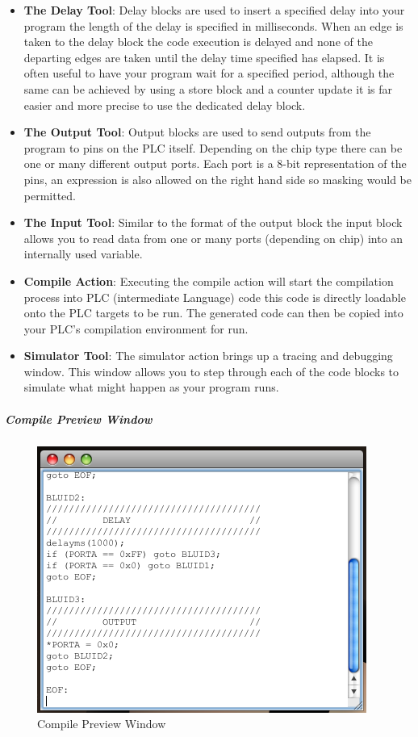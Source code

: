 \begin{itemize}
\item \textbf{The Delay Tool}: Delay blocks are used to insert a specified delay into your program the length of the delay is specified in milliseconds. When an edge is taken to the delay block the code execution is delayed and none of the departing edges are taken until the delay time specified has elapsed. It is often useful to have your program wait for a specified period, although the same can be achieved by using a store block and a counter update it is far easier and more precise to use the dedicated delay block.
\item \textbf{The Output Tool}: Output blocks are used to send outputs from the program to pins on the PLC itself. Depending on the chip type there can be one or many different output ports. Each port is a 8-bit representation of the pins, an expression is also allowed on the right hand side so masking would be permitted.
\item \textbf{The Input Tool}: Similar to the format of the output block the input block allows you to read data from one or many ports (depending on chip) into an internally used variable.

\item \textbf{Compile Action}: Executing the compile action will start the compilation process into PLC  (intermediate Language) code this code is directly loadable onto the PLC targets to be run. The generated code can then be copied into your PLC's compilation environment for run.

\item \textbf{Simulator Tool}: The simulator action brings up a tracing and debugging window. This window allows you to step through each of the code blocks to simulate what might happen as your program runs.
\end{itemize}

\subparagraph{Compile Preview Window}
\begin{figure}[htp]
    \centering
    \includegraphics[width=\imgmedium]{./images/plcedit_compile.png}
    \caption{Compile Preview Window}
    \label{fig:plcedit_compile}
\end{figure}

